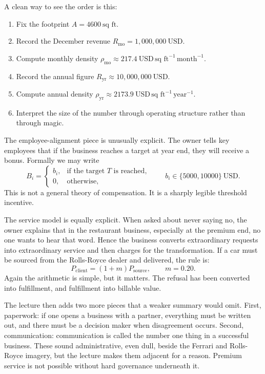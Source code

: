 A clean way to see the order is this:
\begin{enumerate}
\item Fix the footprint \(A=4600\ \text{sq ft}\).
\item Record the December revenue \(R_{\mathrm{mo}}=1{,}000{,}000\ \text{USD}\).
\item Compute monthly density \(\rho_{\mathrm{mo}}\approx 217.4\ \text{USD}\,\text{sq ft}^{-1}\,\text{month}^{-1}\).
\item Record the annual figure \(R_{\mathrm{yr}}\approx 10{,}000{,}000\ \text{USD}\).
\item Compute annual density \(\rho_{\mathrm{yr}}\approx 2173.9\ \text{USD}\,\text{sq ft}^{-1}\,\text{year}^{-1}\).
\item Interpret the size of the number through operating structure rather than through magic.
\end{enumerate}

The employee-alignment piece is unusually explicit. The owner tells key employees that if the business reaches a target at year end, they will receive a bonus. Formally we may write
\begin{equation}
B_i=
\begin{cases}
b_i, & \text{if the target }T\text{ is reached},\\
0, & \text{otherwise},
\end{cases}
\qquad
b_i\in\{5000,10000\}\ \text{USD}.
\end{equation}
This is not a general theory of compensation. It is a sharply legible threshold incentive.

The service model is equally explicit. When asked about never saying no, the owner explains that in the restaurant business, especially at the premium end, no one wants to hear that word. Hence the business converts extraordinary requests into extraordinary service and then charges for the transformation. If a car must be sourced from the Rolls-Royce dealer and delivered, the rule is:
\begin{equation}
P_{\mathrm{client}}=(1+m)P_{\mathrm{source}},
\qquad
m=0.20.
\end{equation}
Again the arithmetic is simple, but it matters. The refusal has been converted into fulfillment, and fulfillment into billable value.

The lecture then adds two more pieces that a weaker summary would omit. First, paperwork: if one opens a business with a partner, everything must be written out, and there must be a decision maker when disagreement occurs. Second, communication: communication is called the number one thing in a successful business. These sound administrative, even dull, beside the Ferrari and Rolls-Royce imagery, but the lecture makes them adjacent for a reason. Premium service is not possible without hard governance underneath it.

